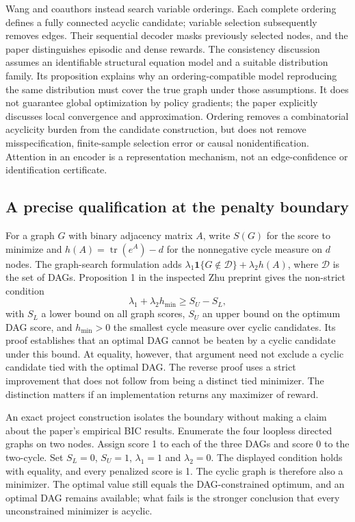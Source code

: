 Wang and coauthors instead search variable orderings. Each complete ordering defines a fully
connected acyclic candidate; variable selection subsequently removes edges. Their sequential
decoder masks previously selected nodes, and the paper distinguishes episodic and dense rewards.
The consistency discussion assumes an identifiable structural equation model and a suitable
distribution family. Its proposition explains why an ordering-compatible model reproducing the
same distribution must cover the true graph under those assumptions. It does not guarantee
global optimization by policy gradients; the paper explicitly discusses local convergence and
approximation. Ordering removes a combinatorial acyclicity burden from the candidate construction,
but does not remove misspecification, finite-sample selection error or causal nonidentification.
Attention in an encoder is a representation mechanism, not an edge-confidence or identification
certificate.~\citep{exec28_rl_wang}

\subsection{A precise qualification at the penalty boundary}
For a graph $G$ with binary adjacency matrix $A$, write $S(G)$ for the score to minimize and
$h(A)=\operatorname{tr}(e^A)-d$ for the nonnegative cycle measure on $d$ nodes. The graph-search
formulation adds $\lambda_1\mathbf{1}\{G\notin\mathcal D\}+\lambda_2h(A)$, where $\mathcal D$
is the set of DAGs. Proposition 1 in the inspected Zhu preprint gives the non-strict condition
\[
 \lambda_1+\lambda_2h_{\min}\geq S_U-S_L,
\]
with $S_L$ a lower bound on all graph scores, $S_U$ an upper bound on the optimum DAG score, and
$h_{\min}>0$ the smallest cycle measure over cyclic candidates. Its proof establishes that an
optimal DAG cannot be beaten by a cyclic candidate under this bound. At equality, however, that
argument need not exclude a cyclic candidate tied with the optimal DAG. The reverse proof uses
a strict improvement that does not follow from being a distinct tied minimizer. The distinction
matters if an implementation returns any maximizer of reward.~\citep{exec28_rl_zhu}

An exact project construction isolates the boundary without making a claim about the paper's
empirical BIC results. Enumerate the four loopless directed graphs on two nodes. Assign score 1
to each of the three DAGs and score 0 to the two-cycle. Set $S_L=0$, $S_U=1$,
$\lambda_1=1$ and $\lambda_2=0$. The displayed condition holds with equality, and every penalized
score is 1. The cyclic graph is therefore also a minimizer. The optimal value still equals the
DAG-constrained optimum, and an optimal DAG remains available; what fails is the stronger
conclusion that every unconstrained minimizer is acyclic.~\citep{exec28_rl_reference}

